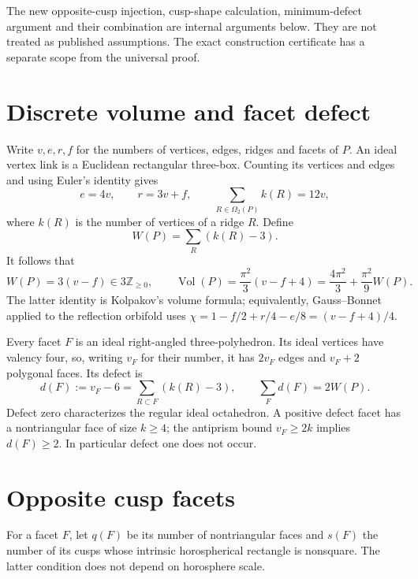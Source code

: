 \documentclass[11pt]{article}
\newcommand{\Vol}{\operatorname{Vol}}
\begin{document}
The new opposite-cusp injection, cusp-shape calculation, minimum-defect
argument and their combination are internal arguments below. They are
not treated as published assumptions. The exact construction certificate
has a separate scope from the universal proof.

\section{Discrete volume and facet defect}
Write $v,e,r,f$ for the numbers of vertices, edges, ridges and facets of
$P$. An ideal vertex link is a Euclidean rectangular three-box. Counting
its vertices and edges and using Euler's identity gives
\[
 e=4v,\qquad r=3v+f,\qquad
 \sum_{R\in\Omega_2(P)} k(R)=12v,
\]
where $k(R)$ is the number of vertices of a ridge $R$. Define
\[
 W(P)=\sum_R(k(R)-3).
\]
It follows that
\begin{equation}\label{eq:discrete}
 W(P)=3(v-f)\in3\mathbb Z_{\ge0},\qquad
 \Vol(P)=\frac{\pi^2}{3}(v-f+4)
 =\frac{4\pi^2}{3}+\frac{\pi^2}{9}W(P).
\end{equation}
The latter identity is Kolpakov's volume formula; equivalently,
Gauss--Bonnet applied to the reflection orbifold uses
$\chi=1-f/2+r/4-e/8=(v-f+4)/4$.

Every facet $F$ is an ideal right-angled three-polyhedron. Its ideal
vertices have valency four, so, writing $v_F$ for their number, it has
$2v_F$ edges and $v_F+2$ polygonal faces. Its defect is
\begin{equation}\label{eq:facet}
 d(F):=v_F-6=\sum_{R\subset F}(k(R)-3),\qquad
 \sum_F d(F)=2W(P).
\end{equation}
Defect zero characterizes the regular ideal octahedron. A positive
defect facet has a nontriangular face of size $k\ge4$; the antiprism
bound $v_F\ge2k$ implies $d(F)\ge2$. In particular defect one does not
occur.

\section{Opposite cusp facets}
For a facet $F$, let $q(F)$ be its number of nontriangular faces and
$s(F)$ the number of its cusps whose intrinsic horospherical rectangle
is nonsquare. The latter condition does not depend on horosphere scale.
\end{document}
